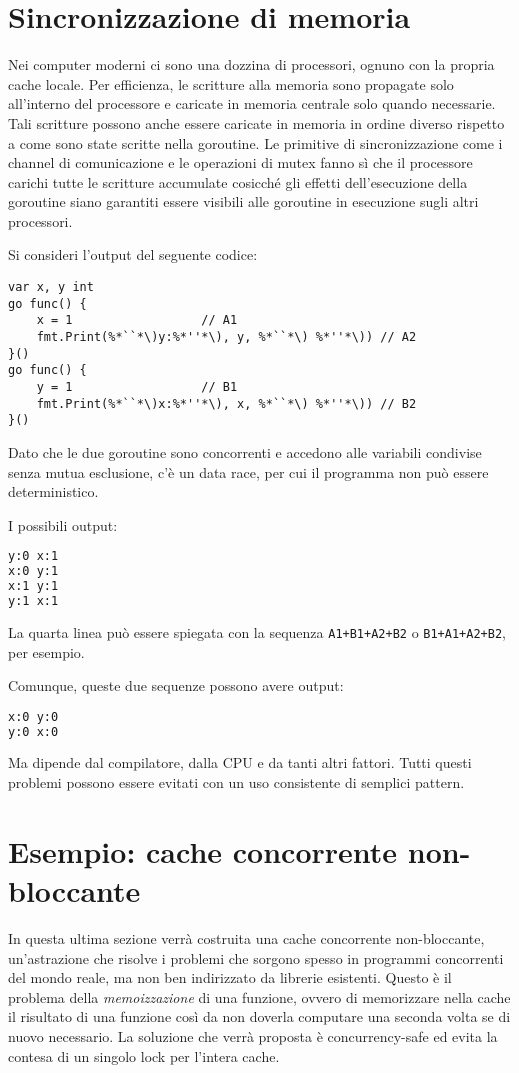 \section{Sincronizzazione di memoria}
\label{sec:sincronizzazione_di_memoria}%
Nei computer moderni ci sono una dozzina di processori, ognuno con la propria cache locale.
Per efficienza, le scritture alla memoria sono propagate solo all'interno del processore e caricate in memoria centrale solo quando necessarie.
Tali scritture possono anche essere caricate in memoria in ordine diverso rispetto a come sono state scritte nella goroutine.
Le primitive di sincronizzazione come i channel di comunicazione e le operazioni di mutex fanno sì che il processore carichi tutte le scritture accumulate cosicché gli effetti dell'esecuzione della goroutine siano garantiti essere visibili alle goroutine in esecuzione sugli altri processori.

Si consideri l'output del seguente codice:
\begin{lstlisting}[frame=single, label={lst:lstlisting9-4.1}]
var x, y int
go func() {
    x = 1                  // A1
    fmt.Print(%*``*\)y:%*''*\), y, %*``*\) %*''*\)) // A2
}()
go func() {
    y = 1                  // B1
    fmt.Print(%*``*\)x:%*''*\), x, %*``*\) %*''*\)) // B2
}()
\end{lstlisting}
Dato che le due goroutine sono concorrenti e accedono alle variabili condivise senza mutua esclusione, c'è un data race, per cui il programma non può essere deterministico.

I possibili output:
\begin{lstlisting}[language=bash, frame=L, label={lst:lstlisting9-4.2}]
y:0 x:1
x:0 y:1
x:1 y:1
y:1 x:1
\end{lstlisting}
La quarta linea può essere spiegata con la sequenza \verb|A1+B1+A2+B2| o \verb|B1+A1+A2+B2|, per esempio.

Comunque, queste due sequenze possono avere output:
\begin{lstlisting}[language=bash, frame=L, label={lst:lstlisting9-4.3}]
x:0 y:0
y:0 x:0
\end{lstlisting}
Ma dipende dal compilatore, dalla CPU e da tanti altri fattori.
Tutti questi problemi possono essere evitati con un uso consistente di semplici pattern.


\section{Esempio: cache concorrente non-bloccante}
\label{sec:esempio_cache_concorrente_nonbloccante}%
In questa ultima sezione verrà costruita una cache concorrente non-bloccante, un'astrazione che risolve i problemi che sorgono spesso in programmi concorrenti del mondo reale, ma non ben indirizzato da librerie esistenti.
Questo è il problema della \textit{memoizzazione} di una funzione, ovvero di memorizzare nella cache il risultato di una funzione così da non doverla computare una seconda volta se di nuovo necessario.
La soluzione che verrà proposta è concurrency-safe ed evita la contesa di un singolo lock per l'intera cache.

